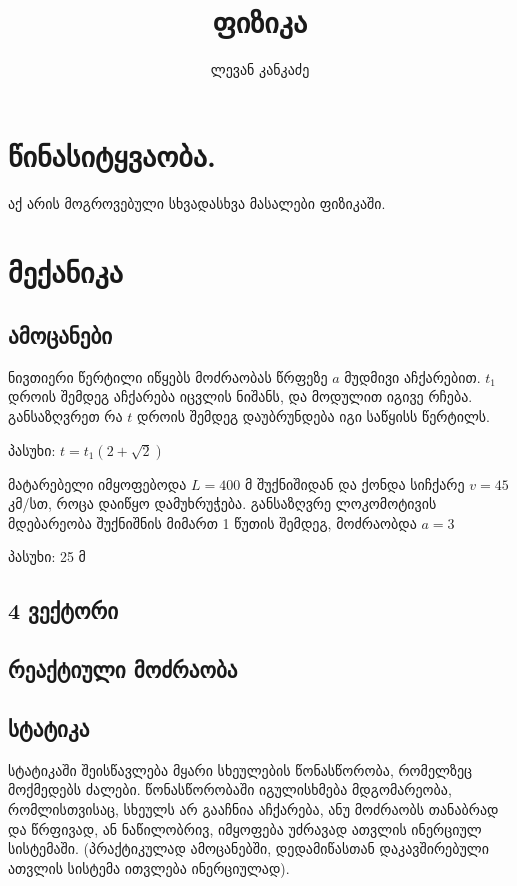 \documentclass[a4paper]{book}
\title{ფიზიკა}
\author{ლევან კანკაძე}
\begin{document}
\maketitle

\tableofcontents

\chapter{წინასიტყვაობა.}
აქ არის მოგროვებული სხვადასხვა მასალები ფიზიკაში.


\chapter{მექანიკა}

\section{ამოცანები}
ნივთიერი წერტილი იწყებს მოძრაობას წრფეზე $a$ მუდმივი აჩქარებით. $t_1$ დროის შემდეგ აჩქარება იცვლის ნიშანს, და მოდულით იგივე რჩება.
განსაზღვრეთ რა $t$ დროის შემდეგ დაუბრუნდება იგი საწყისს წერტილს.

პასუხი: $t = t_1(2 + \sqrt{2})$

მატარებელი იმყოფებოდა $L = 400$ მ შუქნიშიდან და ქონდა სიჩქარე $v = 45$ კმ/სთ, როცა დაიწყო დამუხრუჭება. 
განსაზღვრე ლოკომოტივის მდებარეობა შუქნიშნის მიმართ 1 წუთის შემდეგ, მოძრაობდა $a = 3$

პასუხი: 25 მ

\section{4 ვექტორი}

\section{რეაქტიული მოძრაობა}

\section{სტატიკა} სტატიკაში შეისწავლება მყარი სხეულების წონასწორობა, რომელზეც მოქმედებს ძალები. წონასწორობაში იგულისხმება მდგომარეობა, რომლისთვისაც, სხეულს არ გააჩნია აჩქარება, ანუ მოძრაობს თანაბრად და წრფივად, ან ნაწილობრივ, იმყოფება უძრავად ათვლის ინერციულ სისტემაში. (პრაქტიკულად ამოცანებში, დედამიწასთან დაკავშირებული ათვლის სისტემა ითვლება ინერციულად).
\end{document}
